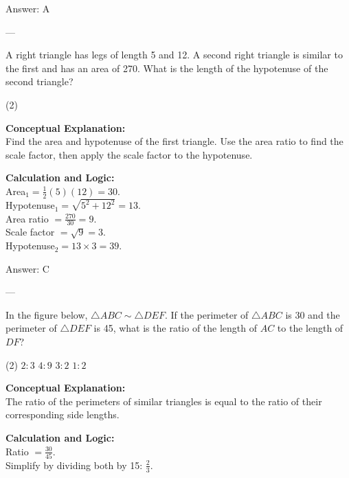 \documentclass[11pt,paper=a4,answers]{exam}
\begin{document}
\begin{questions}
\begin{solution}
\vspace{15pt}
Answer: \colorbox{yellow!100}{A}
\end{solution}

---

\question
A right triangle has legs of length 5 and 12. A second right triangle is similar to the first and has an area of 270. What is the length of the hypotenuse of the second triangle?
\begin{tasks}(2)
\end{tasks}

\begin{solution}
\textbf{Conceptual Explanation:} \\
Find the area and hypotenuse of the first triangle. Use the area ratio to find the scale factor, then apply the scale factor to the hypotenuse.

\vspace{10pt}
\textbf{Calculation and Logic:} \\
Area$_1 = \frac{1}{2}(5)(12) = 30$. \\
Hypotenuse$_1 = \sqrt{5^2 + 12^2} = 13$. \\
Area ratio $= \frac{270}{30} = 9$. \\
Scale factor $= \sqrt{9} = 3$. \\
Hypotenuse$_2 = 13 \times 3 = 39$.

\vspace{15pt}
Answer: \colorbox{yellow!100}{C}
\end{solution}

---

\question
In the figure below, $\triangle ABC \sim \triangle DEF$. If the perimeter of $\triangle ABC$ is 30 and the perimeter of $\triangle DEF$ is 45, what is the ratio of the length of $AC$ to the length of $DF$?
\begin{tasks}(2)
    \task $2:3$
    \task $4:9$
    \task $3:2$
    \task $1:2$
\end{tasks}

\begin{solution}
\textbf{Conceptual Explanation:} \\
The ratio of the perimeters of similar triangles is equal to the ratio of their corresponding side lengths.

\vspace{10pt}
\textbf{Calculation and Logic:} \\
Ratio $= \frac{30}{45}$. \\
Simplify by dividing both by 15: $\frac{2}{3}$.


\end{solution}
\end{questions}
\end{document}
